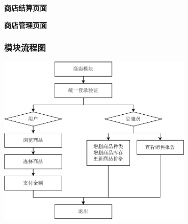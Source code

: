 \documentclass{article}
\begin{document}
\begin{center}
\textbf{商店结算页面}
\end{center}

\begin{center}
\textbf{商店管理页面}
\end{center}

\subsubsection{模块流程图}

\begin{center}
\includegraphics[width=0.7\textwidth]{fig/store-flowchart.pdf}
\end{center}
\end{document}

